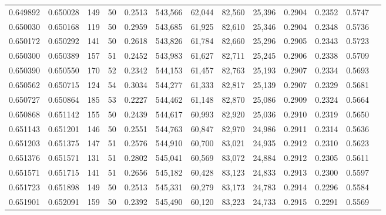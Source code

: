 \begin{tabular}{rrrrrrrrrrrrr}
0.649892 & 0.650028 &   149 &  50 &                                     0.2513 & 543,566 &  62,044 &  82,560 &  25,396 & 0.2904 & 0.2352 & 0.5747 \\
0.650030 & 0.650168 &   119 &  50 &                                     0.2959 & 543,685 &  61,925 &  82,610 &  25,346 & 0.2904 & 0.2348 & 0.5736 \\
0.650172 & 0.650292 &   141 &  50 &                                     0.2618 & 543,826 &  61,784 &  82,660 &  25,296 & 0.2905 & 0.2343 & 0.5723 \\
0.650300 & 0.650389 &   157 &  51 &                                     0.2452 & 543,983 &  61,627 &  82,711 &  25,245 & 0.2906 & 0.2338 & 0.5709 \\
0.650390 & 0.650550 &   170 &  52 &                                     0.2342 & 544,153 &  61,457 &  82,763 &  25,193 & 0.2907 & 0.2334 & 0.5693 \\
0.650562 & 0.650715 &   124 &  54 &                                     0.3034 & 544,277 &  61,333 &  82,817 &  25,139 & 0.2907 & 0.2329 & 0.5681 \\
0.650727 & 0.650864 &   185 &  53 &                                     0.2227 & 544,462 &  61,148 &  82,870 &  25,086 & 0.2909 & 0.2324 & 0.5664 \\
0.650868 & 0.651142 &   155 &  50 &                                     0.2439 & 544,617 &  60,993 &  82,920 &  25,036 & 0.2910 & 0.2319 & 0.5650 \\
0.651143 & 0.651201 &   146 &  50 &                                     0.2551 & 544,763 &  60,847 &  82,970 &  24,986 & 0.2911 & 0.2314 & 0.5636 \\
0.651203 & 0.651375 &   147 &  51 &                                     0.2576 & 544,910 &  60,700 &  83,021 &  24,935 & 0.2912 & 0.2310 & 0.5623 \\
0.651376 & 0.651571 &   131 &  51 &                                     0.2802 & 545,041 &  60,569 &  83,072 &  24,884 & 0.2912 & 0.2305 & 0.5611 \\
0.651571 & 0.651715 &   141 &  51 &                                     0.2656 & 545,182 &  60,428 &  83,123 &  24,833 & 0.2913 & 0.2300 & 0.5597 \\
0.651723 & 0.651898 &   149 &  50 &                                     0.2513 & 545,331 &  60,279 &  83,173 &  24,783 & 0.2914 & 0.2296 & 0.5584 \\
0.651901 & 0.652091 &   159 &  50 &                                     0.2392 & 545,490 &  60,120 &  83,223 &  24,733 & 0.2915 & 0.2291 & 0.5569 \\

\end{tabular}
